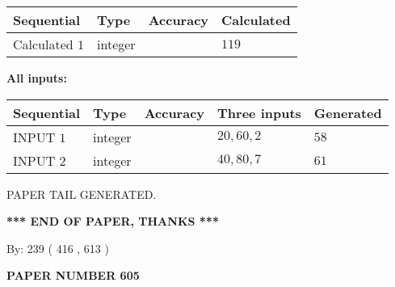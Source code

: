 \documentclass[12pt]{article}
\begin{document}
   
   
   
\noindent{}
   
   
  
  
\noindent\begin{tabular}{|l|l|l|l|}
\hline
 Sequential & Type & Accuracy & Calculated \\ 
\hline
 
 
  Calculated $  1 $ & integer &  & 
  $ 119 $ 
 \\  \hline  
 \end{tabular}
   
   
   
   
\noindent\vspace{0.1in}\hspace{-0.08in} {\textbf{\Large{All inputs: }}}
   
   
  
  
\noindent\begin{tabular}{|l|l|l|l|l|}
\hline
 Sequential & Type & Accuracy & Three inputs & Generated \\ 
\hline
 
 
  INPUT $  1 $ & integer &  & $
 20
 , 
 60
 , 
 2
 $ & $ 58 $ 
 \\  \hline  
 
 
  INPUT $  2 $ & integer &  & $
 40
 , 
 80
 , 
 7
 $ & $ 61 $ 
 \\  \hline  
 \end{tabular}
   
   
   
   
   
   
 \vspace{0.2in}
 
   
   
\vspace{2.0in} PAPER TAIL GENERATED.
   
   
   
   
\vspace{1.0in} 
{\textbf{\large{ *** END OF PAPER, THANKS *** }}} 
   
   
\hspace{1.0in} By: 
 239 ( 416 ,  613 )
   
   
   
   
\newpage 
\setcounter{page}{ 
   605001 } 
   
   
   
   
 {\textbf{ \Large{ PAPER NUMBER  605  }}}
   
\end{document}
